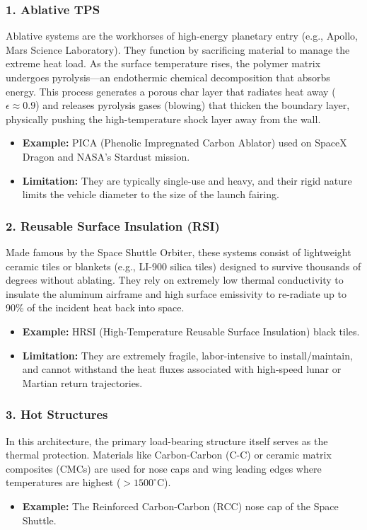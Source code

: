 \subsubsection*{1. Ablative TPS}
Ablative systems are the workhorses of high-energy planetary entry (e.g., Apollo, Mars Science Laboratory). They function by sacrificing material to manage the extreme heat load. As the surface temperature rises, the polymer matrix undergoes pyrolysis—an endothermic chemical decomposition that absorbs energy. This process generates a porous char layer that radiates heat away ($\epsilon \approx 0.9$) and releases pyrolysis gases (blowing) that thicken the boundary layer, physically pushing the high-temperature shock layer away from the wall.
\begin{itemize}
    \item \textbf{Example:} PICA (Phenolic Impregnated Carbon Ablator) used on SpaceX Dragon and NASA's Stardust mission.
    \item \textbf{Limitation:} They are typically single-use and heavy, and their rigid nature limits the vehicle diameter to the size of the launch fairing.
\end{itemize}



\subsubsection*{2. Reusable Surface Insulation (RSI)}
Made famous by the Space Shuttle Orbiter, these systems consist of lightweight ceramic tiles or blankets (e.g., LI-900 silica tiles) designed to survive thousands of degrees without ablating. They rely on extremely low thermal conductivity to insulate the aluminum airframe and high surface emissivity to re-radiate up to 90\% of the incident heat back into space.
\begin{itemize}
    \item \textbf{Example:} HRSI (High-Temperature Reusable Surface Insulation) black tiles.
    \item \textbf{Limitation:} They are extremely fragile, labor-intensive to install/maintain, and cannot withstand the heat fluxes associated with high-speed lunar or Martian return trajectories.
\end{itemize}

\subsubsection*{3. Hot Structures}
In this architecture, the primary load-bearing structure itself serves as the thermal protection. Materials like Carbon-Carbon (C-C) or ceramic matrix composites (CMCs) are used for nose caps and wing leading edges where temperatures are highest ($> 1500^\circ$C).
\begin{itemize}
    \item \textbf{Example:} The Reinforced Carbon-Carbon (RCC) nose cap of the Space Shuttle.
\end{itemize}

